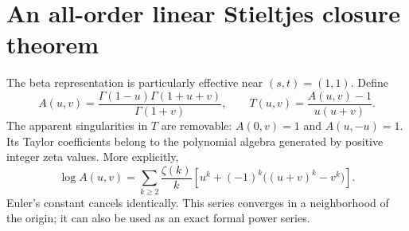 \section{An all-order linear Stieltjes closure theorem}\label{shj:closure}
The beta representation is particularly effective near $(s,t)=(1,1)$. Define
\begin{equation}\label{shj:AandT}
A(u,v)=\frac{\Gamma(1-u)\Gamma(1+u+v)}{\Gamma(1+v)},
\qquad T(u,v)=\frac{A(u,v)-1}{u(u+v)}.
\end{equation}
The apparent singularities in $T$ are removable: $A(0,v)=1$ and $A(u,-u)=1$. Its Taylor coefficients belong to the polynomial algebra generated by positive integer zeta values. More explicitly,
\begin{equation}\label{shj:logA}
\log A(u,v)=\sum_{k\ge2}\frac{\zeta(k)}k
\left[u^k+(-1)^k\big((u+v)^k-v^k\big)\right].
\end{equation}
Euler's constant cancels identically. This series converges in a neighborhood of the origin; it can also be used as an exact formal power series.

